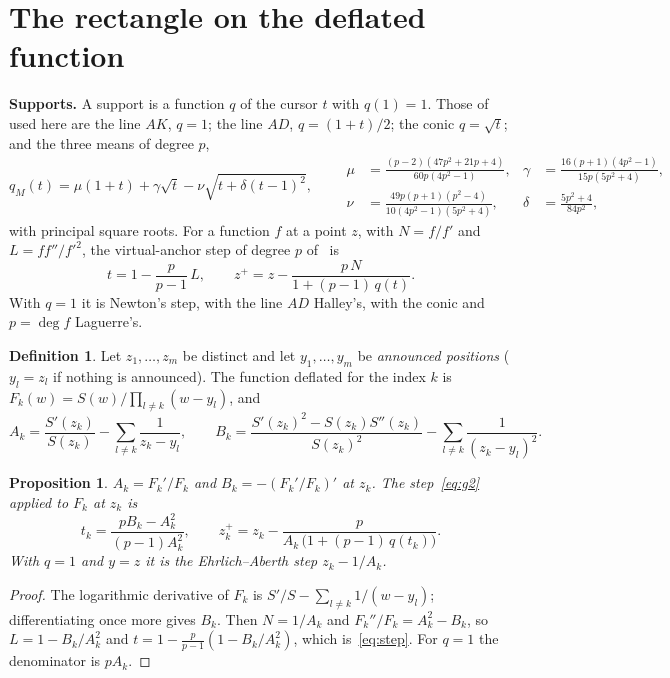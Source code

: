 \documentclass[10pt,a4paper]{article}
\newtheorem{proposition}[theorem]{Proposition}
\theoremstyle{definition}
\newtheorem{definition}[theorem]{Definition}
\numberwithin{equation}{section}
\begin{document}
\section{The rectangle on the deflated function}\label{sec:step}
\textbf{Supports.} A support is a function $q$ of the cursor $t$ with $q(1)=1$. Those of~\cite{v29}
used here are the line $AK$, $q=1$; the line $AD$, $q=(1+t)/2$; the conic $q=\sqrt t$; and the three
means of degree $p$,
\[
 q_M(t)=\mu(1+t)+\gamma\sqrt t-\nu\sqrt{t+\delta(t-1)^2},\qquad
 \begin{aligned}
 \mu&=\tfrac{(p-2)(47p^2+21p+4)}{60p(4p^2-1)}, & \gamma&=\tfrac{16(p+1)(4p^2-1)}{15p(5p^2+4)},\\
 \nu&=\tfrac{49p(p+1)(p^2-4)}{10(4p^2-1)(5p^2+4)}, & \delta&=\tfrac{5p^2+4}{84p^2},
 \end{aligned}
\]
with principal square roots. For a function $f$ at a point $z$, with $N=f/f'$ and $L=ff''/f'^2$, the
virtual-anchor step of degree $p$ of~\cite{g2} is
\begin{equation}\label{eq:g2}
 t=1-\frac{p}{p-1}\,L,\qquad z^+=z-\frac{p\,N}{1+(p-1)\,q(t)} .
\end{equation}
With $q=1$ it is Newton's step, with the line $AD$ Halley's, with the conic and $p=\deg f$ Laguerre's.

\begin{definition}\label{def:defl}
Let $z_1,\dots,z_m$ be distinct and let $y_1,\dots,y_m$ be \emph{announced positions} ($y_l=z_l$ if
nothing is announced). The function deflated for the index $k$ is
$F_k(w)=S(w)\big/\prod_{l\ne k}(w-y_l)$, and
\begin{equation}\label{eq:AB}
 A_k=\frac{S'(z_k)}{S(z_k)}-\sum_{l\ne k}\frac1{z_k-y_l},\qquad
 B_k=\frac{S'(z_k)^2-S(z_k)S''(z_k)}{S(z_k)^2}-\sum_{l\ne k}\frac1{(z_k-y_l)^2}.
\end{equation}
\end{definition}

\begin{proposition}\label{prop:step}
$A_k=F_k'/F_k$ and $B_k=-(F_k'/F_k)'$ at $z_k$. The step~\eqref{eq:g2} applied to $F_k$ at $z_k$ is
\begin{equation}\label{eq:step}
 t_k=\frac{pB_k-A_k^2}{(p-1)A_k^2},\qquad z_k^+=z_k-\frac{p}{A_k\,\bigl(1+(p-1)\,q(t_k)\bigr)} .
\end{equation}
With $q=1$ and $y=z$ it is the Ehrlich--Aberth step $z_k-1/A_k$.
\end{proposition}
\begin{proof}
The logarithmic derivative of $F_k$ is $S'/S-\sum_{l\ne k}1/(w-y_l)$; differentiating once more gives
$B_k$. Then $N=1/A_k$ and $F_k''/F_k=A_k^2-B_k$, so $L=1-B_k/A_k^2$ and
$t=1-\frac p{p-1}(1-B_k/A_k^2)$, which is~\eqref{eq:step}. For $q=1$ the denominator is $pA_k$.
\end{proof}
\end{document}
